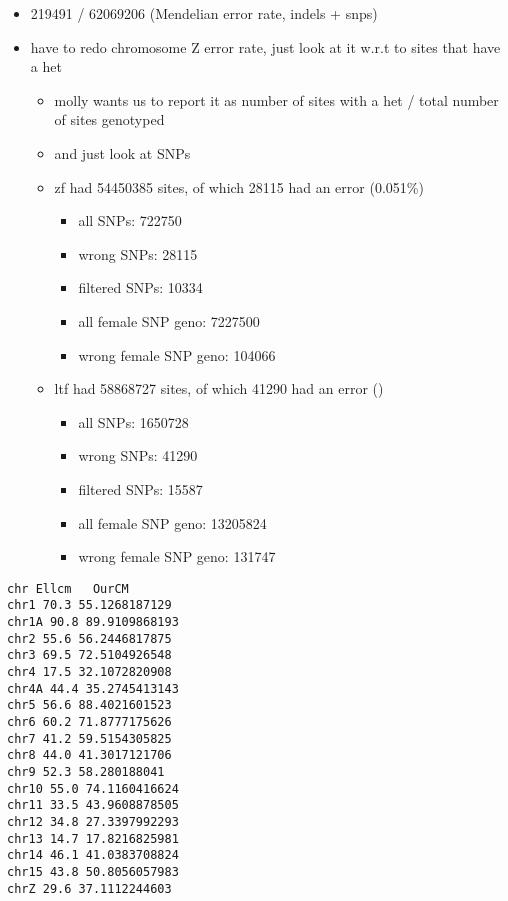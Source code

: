 \documentclass[idxtotoc,hyperref,openany,oneside]{labbook} %
\begin{document}
\begin{itemize}
\item 219491 / 62069206 (Mendelian error rate, indels + snps)
\item have to redo chromosome Z error rate, just look at it w.r.t to sites that have a het
	\begin{itemize}
	\item molly wants us to report it as number of sites with a het / total number of sites genotyped
	\item and just look at SNPs
	\item zf had 54450385 sites, of which 28115 had an error (0.051\%)
		\begin{itemize}
			\item all SNPs: 722750
			\item wrong SNPs: 28115
			\item filtered SNPs: 10334
			\item all female SNP geno: 7227500
			\item wrong female SNP geno: 104066
		\end{itemize}
	\item ltf had 58868727 sites, of which 41290 had an error ()
		\begin{itemize}
			\item all SNPs: 1650728
			\item wrong SNPs: 41290
			\item filtered SNPs: 15587
			\item all female SNP geno: 13205824
			\item wrong female SNP geno: 131747
		\end{itemize}
\end{itemize}
\end{itemize}

\begin{verbatim}
chr Ellcm	OurCM
chr1 70.3 55.1268187129
chr1A 90.8 89.9109868193
chr2 55.6 56.2446817875
chr3 69.5 72.5104926548
chr4 17.5 32.1072820908
chr4A 44.4 35.2745413143
chr5 56.6 88.4021601523
chr6 60.2 71.8777175626
chr7 41.2 59.5154305825
chr8 44.0 41.3017121706
chr9 52.3 58.280188041
chr10 55.0 74.1160416624
chr11 33.5 43.9608878505
chr12 34.8 27.3397992293
chr13 14.7 17.8216825981
chr14 46.1 41.0383708824
chr15 43.8 50.8056057983
chrZ 29.6 37.1112244603
\end{verbatim}
\end{document}
